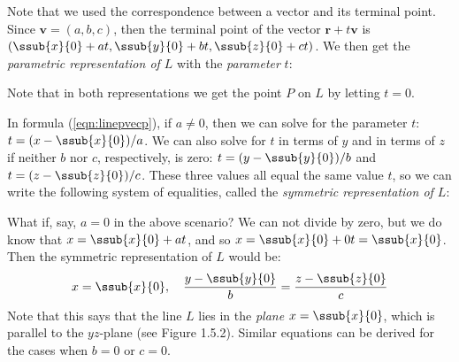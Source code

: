 \vspace{1mm}
Note that we used the correspondence between a vector and its terminal point. Since $\textbf{v} = (a,b,c)$, then the
terminal point of the vector $\textbf{r} + t \textbf{v}$ is $(\ssub{x}{0} + at,\ssub{y}{0} + bt,\ssub{z}{0} + ct)$. We
then get the \emph{parametric representation of $L$} with the
\emph{parameter} $t$:\vspace{1mm}

Note that in both representations we get the point $P$ on $L$ by letting $t = 0$.

In formula (\ref{eqn:linepvecp}), if $a \ne 0$, then we can solve for the parameter $t$: $t = (x - \ssub{x}{0})/a$.
We can also solve for $t$ in terms of $y$ and in terms of $z$ if neither $b$ nor $c$, respectively, is zero:
$t = (y - \ssub{y}{0})/b$ and $t = (z - \ssub{z}{0})/c$. These three values all equal the same value $t$,
so we can write the following system of equalities, called the \emph{symmetric representation of $L$}:\vspace{1mm}

\vspace{1mm}
\piccaption[]{}
What if, say, $a = 0$ in the above scenario? We can not divide by zero, but we do know that $x = \ssub{x}{0} + at$, and
so $x = \ssub{x}{0} + 0t = \ssub{x}{0}$. Then the symmetric representation of $L$
would be:
\begin{equation}\label{eqn:linepvecsa}
 x = \ssub{x}{0}, \quad \frac{y - \ssub{y}{0}}{b} = \frac{z - \ssub{z}{0}}{c}
\end{equation}
Note that this says that the line $L$ lies in the \emph{plane} $x = \ssub{x}{0}$, which is parallel to the $yz$-plane
(see Figure 1.5.2). Similar equations can be derived for the cases when $b = 0$ or $c = 0$.

